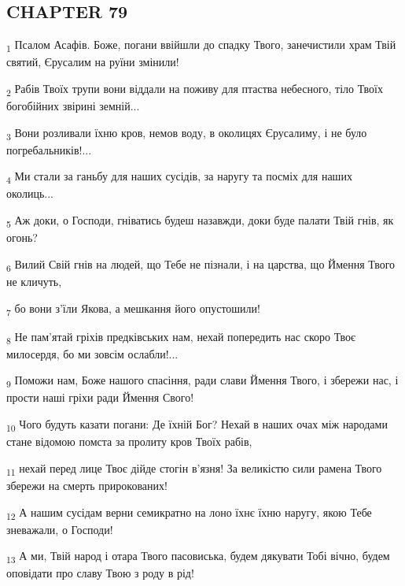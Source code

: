 \subsection{CHAPTER 79}
\begin{tcolorbox}
\textsubscript{1} Псалом Асафів. Боже, погани ввійшли до спадку Твого, занечистили храм Твій святий, Єрусалим на руїни змінили!
\end{tcolorbox}
\begin{tcolorbox}
\textsubscript{2} Рабів Твоїх трупи вони віддали на поживу для птаства небесного, тіло Твоїх богобійних звірині земній...
\end{tcolorbox}
\begin{tcolorbox}
\textsubscript{3} Вони розливали їхню кров, немов воду, в околицях Єрусалиму, і не було погребальників!...
\end{tcolorbox}
\begin{tcolorbox}
\textsubscript{4} Ми стали за ганьбу для наших сусідів, за наругу та посміх для наших околиць...
\end{tcolorbox}
\begin{tcolorbox}
\textsubscript{5} Аж доки, о Господи, гніватись будеш назавжди, доки буде палати Твій гнів, як огонь?
\end{tcolorbox}
\begin{tcolorbox}
\textsubscript{6} Вилий Свій гнів на людей, що Тебе не пізнали, і на царства, що Ймення Твого не кличуть,
\end{tcolorbox}
\begin{tcolorbox}
\textsubscript{7} бо вони з'їли Якова, а мешкання його опустошили!
\end{tcolorbox}
\begin{tcolorbox}
\textsubscript{8} Не пам'ятай гріхів предківських нам, нехай попередить нас скоро Твоє милосердя, бо ми зовсім ослабли!...
\end{tcolorbox}
\begin{tcolorbox}
\textsubscript{9} Поможи нам, Боже нашого спасіння, ради слави Ймення Твого, і збережи нас, і прости наші гріхи ради Ймення Свого!
\end{tcolorbox}
\begin{tcolorbox}
\textsubscript{10} Чого будуть казати погани: Де їхній Бог? Нехай в наших очах між народами стане відомою помста за пролиту кров Твоїх рабів,
\end{tcolorbox}
\begin{tcolorbox}
\textsubscript{11} нехай перед лице Твоє дійде стогін в'язня! За великістю сили рамена Твого збережи на смерть прирокованих!
\end{tcolorbox}
\begin{tcolorbox}
\textsubscript{12} А нашим сусідам верни семикратно на лоно їхнє їхню наругу, якою Тебе зневажали, о Господи!
\end{tcolorbox}
\begin{tcolorbox}
\textsubscript{13} А ми, Твій народ і отара Твого пасовиська, будем дякувати Тобі вічно, будем оповідати про славу Твою з роду в рід!
\end{tcolorbox}

